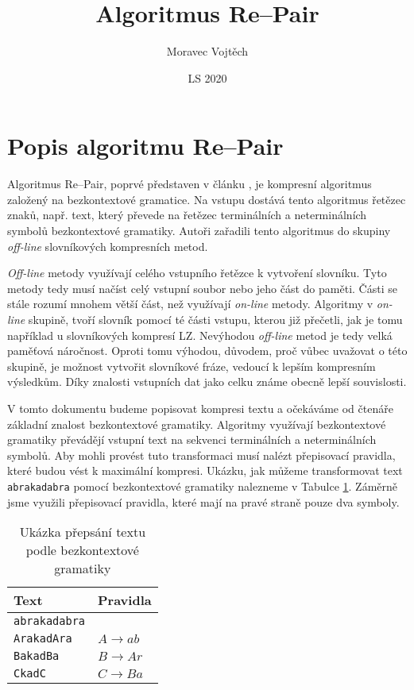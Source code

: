 \documentclass[a4paper,12pt]{article}
\author{Moravec Vojtěch}
\title{Algoritmus Re--Pair}
\date{LS 2020}
\begin{document}
\maketitle
\newpage

\section{Popis algoritmu Re--Pair}
Algoritmus Re--Pair, poprvé představen v článku \cite{892708}, je kompresní algoritmus založený na bezkontextové gramatice. Na vstupu dostává tento algoritmus řetězec znaků, např. text, který převede na řetězec terminálních a neterminálních symbolů bezkontextové gramatiky. Autoři zařadili tento algoritmus do skupiny \emph{off-line} slovníkových kompresních metod. 

\emph{Off-line} metody využívají celého vstupního řetězce k vytvoření slovníku. Tyto metody tedy musí načíst celý vstupní soubor nebo jeho část do paměti. Části se stále rozumí mnohem větší část, než využívají \emph{on-line} metody.  Algoritmy v \emph{on-line} skupině, tvoří slovník pomocí té části vstupu, kterou již přečetli, jak je tomu například u slovníkových kompresí LZ. Nevýhodou \emph{off-line} metod je tedy velká paměťová náročnost. Oproti tomu výhodou, důvodem, proč vůbec uvažovat o této skupině, je možnost vytvořit slovníkové fráze, vedoucí k lepším kompresním výsledkům. Díky znalosti vstupních dat jako celku známe obecně lepší souvislosti.

V tomto dokumentu budeme popisovat kompresi textu a očekáváme od čtenáře základní znalost bezkontextové gramatiky. Algoritmy využívají bezkontextové gramatiky převádějí vstupní text na sekvenci terminálních a neterminálních symbolů. Aby mohli provést tuto transformaci musí nalézt přepisovací pravidla, které budou vést k maximální kompresi. Ukázku, jak můžeme transformovat text \texttt{abrakadabra} pomocí bezkontextové gramatiky nalezneme v Tabulce \ref{tab:cfg}. Záměrně jsme využili přepisovací pravidla, které mají na pravé straně pouze dva symboly.

\begin{table}[h!]
    \centering
    \begin{tabular}{l | l}
    \toprule
    Text                 &   Pravidla            \\ \midrule
    \texttt{abrakadabra} &                       \\
    \texttt{ArakadAra}   &  $A \rightarrow ab $  \\
    \texttt{BakadBa}     &  $B \rightarrow Ar $  \\
    \texttt{CkadC}       &  $C \rightarrow Ba $  \\
    \bottomrule
    \end{tabular}
    \caption{Ukázka přepsání textu podle bezkontextové gramatiky}
    \label{tab:cfg}
\end{table}
\end{document}
